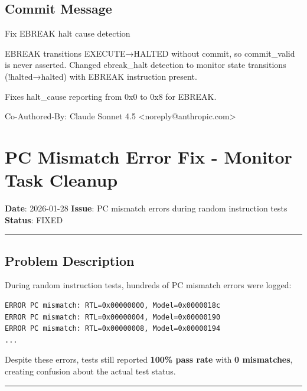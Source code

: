 \subsection{Commit Message}\label{cr:fix:ebreak-bug-fix:commit-message}

\begin{record}

\begin{textblock}
[RTL] Fix EBREAK halt cause detection

EBREAK transitions EXECUTE→HALTED without commit, so commit_valid
is never asserted. Changed ebreak_halt detection to monitor
state transitions (!halted→halted) with EBREAK instruction present.

Fixes halt_cause reporting from 0x0 to 0x8 for EBREAK.

Co-Authored-By: Claude Sonnet 4.5 <noreply@anthropic.com>
\end{textblock}

\end{record}

\section{PC Mismatch Error Fix - Monitor Task Cleanup}\label{cr:fix:pc-mismatch-fix}

\begin{record}

\textbf{Date}: 2026-01-28 \textbf{Issue}: PC mismatch errors during
random instruction tests \textbf{Status}: \ok{} FIXED

\begin{center}\rule{0.5\linewidth}{0.5pt}\end{center}

\end{record}

\subsection{Problem Description}\label{cr:fix:pc-mismatch-fix:problem-description}

\begin{record}

During random instruction tests, hundreds of PC mismatch errors were
logged:

\begin{lstlisting}[language={}]
ERROR PC mismatch: RTL=0x00000000, Model=0x0000018c
ERROR PC mismatch: RTL=0x00000004, Model=0x00000190
ERROR PC mismatch: RTL=0x00000008, Model=0x00000194
...
\end{lstlisting}

Despite these errors, tests still reported \textbf{100\% pass rate} with
\textbf{0 mismatches}, creating confusion about the actual test status.

\begin{center}\rule{0.5\linewidth}{0.5pt}\end{center}

\end{record}


